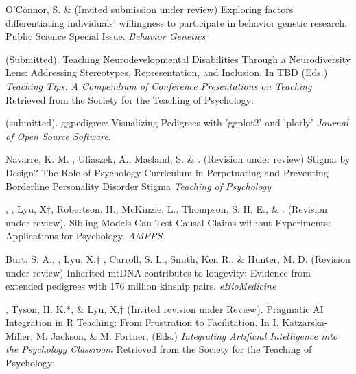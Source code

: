 \begin{etaremune}
\item O'Connor, S. \& \meb (Invited submission under review) Exploring factors differentiating individuals’ willingness to participate in behavior genetic research. Public Science Special Issue. \textit{Behavior Genetics}
\item \meb (Submitted). Teaching Neurodevelopmental Disabilities Through a Neurodiversity Lens: Addressing Stereotypes, Representation, and Inclusion.  In TBD  (Eds.) \textit{Teaching Tips: A Compendium of Conference Presentations on Teaching} Retrieved from the Society for the Teaching of Psychology: \href{http://teachpsych.org/ebooks/}{\small\color{blue}{teachpsych.org/ebooks/}}

\item \meb  (submitted). ggpedigree: Visualizing Pedigrees with 'ggplot2' and 'plotly' \textit{Journal of Open Source Software}. \href{https://joss.theoj.org/papers/e5116b83b03e2740960d1153c45f9480}{\small\color{blue}{submission}}



\item Navarre, K. M. \noteB, Uliaszek, A., Masland, S. \& \meb. (Revision under review) Stigma by Design? The Role of Psychology Curriculum in Perpetuating and Preventing Borderline Personality Disorder Stigma \textit{Teaching of Psychology}

\item \meb, \jt, Lyu, X$\dagger$, Robertson, H.\noteA, McKinzie, L.\noteA, Thompson, S. H. E.\noteA, \& \joe. (Revision under review). Sibling Models Can Test Causal Claims without Experiments: Applications for Psychology. \href{https://osf.io/zpdwt/}{\small\color{blue}{osf.io/zpdwt/}} \textit{AMPPS} %

\item Burt, S. A., \meb, Lyu, X,$\dagger$ \joe, Carroll, S. L., Smith, Ken R., \& Hunter, M. D. (Revision under review) Inherited mtDNA contributes to longevity: Evidence from extended pedigrees with 176 million kinship pairs. \textit{eBioMedicine}%

\item \meb, Tyson, H. K.*, \& Lyu, X,$\dagger$ (Invited revision under Review). Pragmatic AI Integration in R Teaching: From Frustration to Facilitation.  In I. Katzarska-Miller, M. Jackson, \& M. Fortner,  (Eds.) \textit{Integrating Artificial Intelligence into the Psychology Classroom} Retrieved from the Society for the Teaching of Psychology: \href{http://teachpsych.org/ebooks/}{\small\color{blue}{teachpsych.org/ebooks/}}


\end{etaremune}
